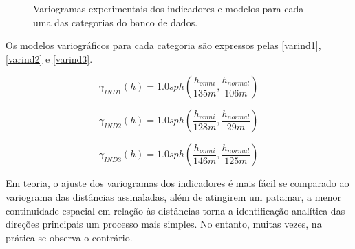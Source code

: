 \begin{figure}[H] 
     \caption{Variogramas experimentais dos indicadores e modelos para cada uma das categorias do banco de dados.} \label{ind_var}
     \centering
\end{figure}

Os modelos variográficos para cada categoria são expressos pelas \autoref{varind1}, \autoref{varind2} e \autoref{varind3}.

\begin{equation}
\label{varind1}
\gamma_{IND1}(h)=1.0sph\left(\frac{h_{omni}}{135m}, \frac{h_{normal}}{106m}\right)
\end{equation}

\begin{equation}
\label{varind2}
\gamma_{IND2}(h)=1.0sph\left(\frac{h_{omni}}{128m}, \frac{h_{normal}}{29m}\right)
\end{equation}

\begin{equation}
\label{varind3}
\gamma_{IND3}(h)=1.0sph\left(\frac{h_{omni}}{146m}, \frac{h_{normal}}{125m}\right)
\end{equation}

Em teoria, o ajuste dos variogramas dos indicadores é mais fácil se comparado ao variograma das distâncias assinaladas, além de atingirem um patamar, a menor continuidade espacial em relação às distâncias torna a identificação analítica das direções principais um processo mais simples. No entanto, muitas vezes, na prática se observa o contrário.

